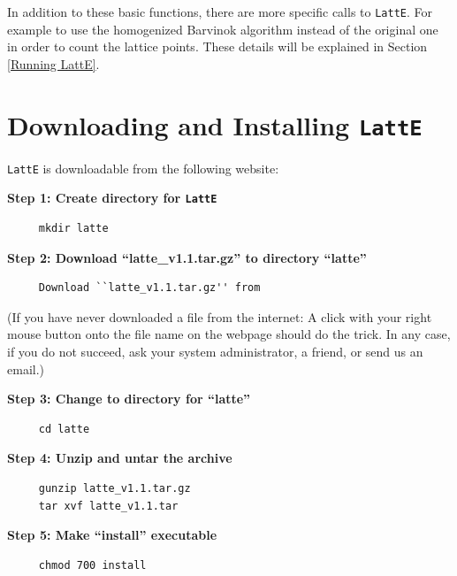\documentclass{article}
\begin{document}
In addition to these basic functions, there are more specific calls to
{\tt LattE}. For example to use the homogenized Barvinok algorithm
instead of the original one in order to count the lattice points. These
details will be explained in Section \ref{Running LattE}.



\newpage

\section{Downloading and Installing {\tt LattE}}

{\tt LattE} is downloadable from the following website:


\textbf{Step 1: Create directory for {\tt LattE}}

\begin{verbatim}
     mkdir latte
\end{verbatim}

\textbf{Step 2: Download ``latte\_v1.1.tar.gz'' to directory ``latte''}

\begin{verbatim}
     Download ``latte_v1.1.tar.gz'' from
\end{verbatim}

 
(If you have never downloaded a file from the internet: A click with
your right mouse button onto the file name on the webpage should do
the trick. In any case, if you do not succeed, ask your system
administrator, a friend, or send us an email.) 

\textbf{Step 3: Change to directory for ``latte''}

\begin{verbatim}
     cd latte
\end{verbatim}

\textbf{Step 4: Unzip and untar the archive} 

\begin{verbatim}
     gunzip latte_v1.1.tar.gz
     tar xvf latte_v1.1.tar
\end{verbatim}

\textbf{Step 5: Make ``install'' executable} 

\begin{verbatim}
     chmod 700 install
\end{verbatim}
\end{document}
